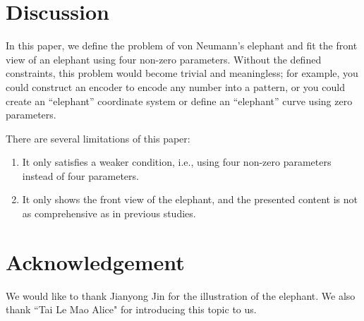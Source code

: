 \documentclass{article}
\begin{document}
\section{Discussion}
In this paper, we define the problem of von Neumann's elephant and fit the front view of an elephant using four non-zero parameters. Without the defined constraints, this problem would become trivial and meaningless; for example, you could construct an encoder to encode any number into a pattern, or you could create an ``elephant'' coordinate system or define an ``elephant'' curve using zero parameters. 

There are several limitations of this paper:

\begin{enumerate}
	\item It only satisfies a weaker condition, i.e., using four non-zero parameters instead of four parameters.
	\item It only shows the front view of the elephant, and the presented content is not as comprehensive as in previous studies.
\end{enumerate}

\section*{Acknowledgement}

We would like to thank Jianyong Jin for the illustration of the elephant. We also thank ``Tai Le Mao Alice" for introducing this topic to us.




	
\end{document}
